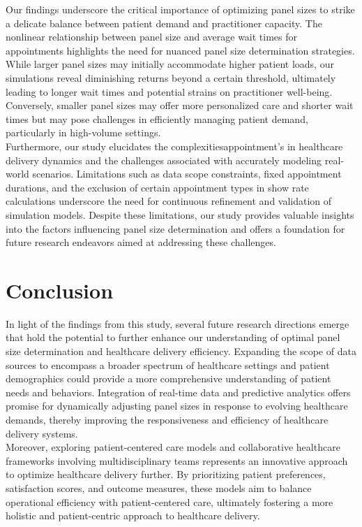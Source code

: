 \documentclass[11pt]{article}
\theoremstyle{definition}
\begin{document}
Our findings underscore the critical importance of optimizing panel sizes to strike a delicate balance between patient demand and practitioner capacity. The nonlinear relationship between panel size and average wait times for appointments highlights the need for nuanced panel size determination strategies. While larger panel sizes may initially accommodate higher patient loads, our simulations reveal diminishing returns beyond a certain threshold, ultimately leading to longer wait times and potential strains on practitioner well-being. Conversely, smaller panel sizes may offer more personalized care and shorter wait times but may pose challenges in efficiently managing patient demand, particularly in high-volume settings. \\

Furthermore, our study elucidates the complexitiesappointment’s  in healthcare delivery dynamics and the challenges associated with accurately modeling real-world scenarios. Limitations such as data scope constraints, fixed appointment durations, and the exclusion of certain appointment types in show rate calculations underscore the need for continuous refinement and validation of simulation models. Despite these limitations, our study provides valuable insights into the factors influencing panel size determination and offers a foundation for future research endeavors aimed at addressing these challenges.


\section{Conclusion}
In light of the findings from this study, several future research directions emerge that hold the potential to further enhance our understanding of optimal panel size determination and healthcare delivery efficiency. Expanding the scope of data sources to encompass a broader spectrum of healthcare settings and patient demographics could provide a more comprehensive understanding of patient needs and behaviors. Integration of real-time data and predictive analytics offers promise for dynamically adjusting panel sizes in response to evolving healthcare demands, thereby improving the responsiveness and efficiency of healthcare delivery systems. \\

Moreover, exploring patient-centered care models and collaborative healthcare frameworks involving multidisciplinary teams represents an innovative approach to optimize healthcare delivery further. By prioritizing patient preferences, satisfaction scores, and outcome measures, these models aim to balance operational efficiency with patient-centered care, ultimately fostering a more holistic and patient-centric approach to healthcare delivery. \\
\end{document}
